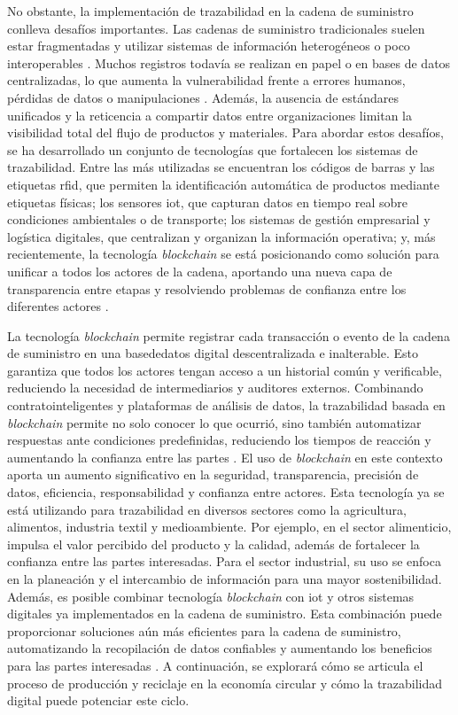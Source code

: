 No obstante, la implementación de trazabilidad en la cadena de suministro conlleva desafíos importantes. Las cadenas de suministro tradicionales suelen estar fragmentadas y utilizar sistemas de información heterogéneos o poco interoperables \cite{torres2022tendencias}. Muchos registros todavía se realizan en papel o en bases de datos centralizadas, lo que aumenta la vulnerabilidad frente a errores humanos, pérdidas de datos o manipulaciones \cite{bartolomeo2020introduccion}. Además, la ausencia de estándares unificados y la reticencia a compartir datos entre organizaciones limitan la visibilidad total del flujo de productos y materiales. Para abordar estos desafíos, se ha desarrollado un conjunto de tecnologías que fortalecen los sistemas de trazabilidad. Entre las más utilizadas se encuentran los códigos de barras y las etiquetas \gls{rfid}, que permiten la identificación automática de productos mediante etiquetas físicas; los sensores \gls{iot}, que capturan datos en tiempo real sobre condiciones ambientales o de transporte; los sistemas de gestión empresarial y logística digitales, que centralizan y organizan la información operativa; y, más recientemente, la tecnología \textit{blockchain} se está posicionando como solución para unificar a todos los actores de la cadena, aportando una nueva capa de transparencia entre etapas y resolviendo problemas de confianza entre los diferentes actores \cite{wong2024enhancing}.

La tecnología \textit{blockchain} permite registrar cada transacción o evento de la cadena de suministro en una \gls{basededatos} digital descentralizada e inalterable. Esto garantiza que todos los actores tengan acceso a un historial común y verificable, reduciendo la necesidad de intermediarios y auditores externos. Combinando \glspl{contratointeligente} y plataformas de análisis de datos, la trazabilidad basada en \textit{blockchain} permite no solo conocer lo que ocurrió, sino también automatizar respuestas ante condiciones predefinidas, reduciendo los tiempos de reacción y aumentando la confianza entre las partes \cite{wong2024enhancing}. El uso de \textit{blockchain} en este contexto aporta un aumento significativo en la seguridad, transparencia, precisión de datos, eficiencia, responsabilidad y confianza entre actores. Esta tecnología ya se está utilizando para trazabilidad en diversos sectores como la agricultura, alimentos, industria textil y medioambiente. Por ejemplo, en el sector alimenticio, impulsa el valor percibido del producto y la calidad, además de fortalecer la confianza entre las partes interesadas. Para el sector industrial, su uso se enfoca en la planeación y el intercambio de información para una mayor \gls{sostenibilidad}. Además, es posible combinar tecnología \textit{blockchain} con \gls{iot} y otros sistemas digitales ya implementados en la cadena de suministro. Esta combinación puede proporcionar soluciones aún más eficientes para la cadena de suministro, automatizando la recopilación de datos confiables y aumentando los beneficios para las partes interesadas \cite{wong2024enhancing}. A continuación, se explorará cómo se articula el proceso de producción y reciclaje en la economía circular y cómo la trazabilidad digital puede potenciar este ciclo.

